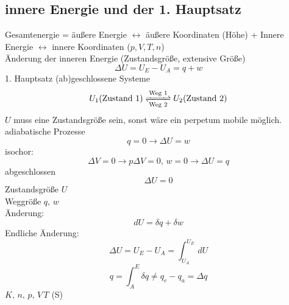 \documentclass[a4paper]{article}
\begin{document}
\subsection[innere Energie 1.HS]{innere Energie und der 1. Hauptsatz}
Gesamtenergie = äußere Energie $\leftrightarrow$ äußere Koordinaten (Höhe) + Innere Energie $\leftrightarrow$ innere Koordinaten ($p,V,T,n$)\\
Änderung der inneren Energie (Zustandsgröße, extensive Größe)
\begin{equation*}
    \Delta U = U_E - U_A = q + w
\end{equation*}
1. Hauptsatz (ab)geschlossene Systeme\\
\begin{equation*}
    U_1 (\text{Zustand 1}) \ce{<=>[{Weg 1}][{Weg 2}]} U_2 (\text{Zustand 2}) 
\end{equation*}
$U$ muss eine Zustandsgröße sein, sonst wäre ein perpetum mobile möglich.\\
adiabatische Prozesse
\begin{equation*}
    q = 0 \rightarrow \Delta U = w
\end{equation*}
isochor:
\begin{equation*}
    \Delta V = 0 \rightarrow p\Delta V = 0, \, w = 0 \rightarrow \Delta U = q
\end{equation*}
abgeschlossen
\begin{equation*}
    \Delta U = 0
\end{equation*}
Zustandsgröße $U$\\
Weggröße $q,\,w$\\
Änderung:
\begin{equation*}
    dU = \delta q + \delta w
\end{equation*}
Endliche Änderung:
\begin{equation*}
    \Delta U = U_E - U_A = \int_{U_A}^{U_E} \,dU
\end{equation*}
\begin{equation*}
    q=\int_{A}^{E} \delta q \neq q_e - q_a = \Delta q
\end{equation*}
$K,\,n,\,p,\,V\,T$ (S)
\end{document}
